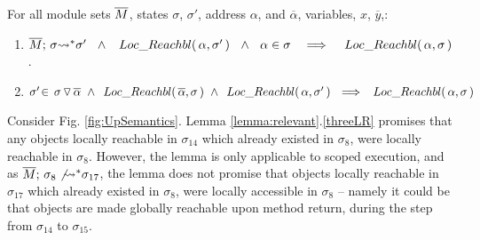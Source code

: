{\begin{lemma}
\label{lemma:relevant}
\label{lemma:push:N}
For all module sets $\overline{M}$, states $\sigma$, $\sigma'$,   address $\alpha$, and $\overline \alpha$, variables, $x$, $\overline {y}$,:
\begin{enumerate}
\item
\label{threeLR}
${\overline{M};\, {\sigma} {\rightsquigarrow^*} \sigma'} \ \ \wedge \ \   \,Loc\_Reachbl(\,\alpha,\sigma'\,)\  \ \wedge\ \  {\alpha\in \sigma} \ \ \ \Longrightarrow \ \ \ \,Loc\_Reachbl(\,\alpha,\sigma\,)$.
\item
\label{oneLR}
{$ \sigma'\!\in\! \PushS {\alpha} {\sigma}   \ \wedge  \  \LRelevant {\overline \alpha} {\sigma}  \ \wedge\    \LRelevant \alpha {\sigma'} \ \  \Longrightarrow\ \ 
 \LRelevant \alpha {\sigma}$
}
\end{enumerate}
\end{lemma}

{Consider Fig.  \ref{fig:UpSemantics}. %
Lemma \ref{lemma:relevant}.\ref{threeLR}  promises that any objects locally reachable in $\sigma_{14}$ which already existed in $\sigma_{8}$, were locally reachable in $\sigma_{8}$. However, the lemma is only  applicable to scoped execution, and as 
$\overline{M};\, {\sigma_8} \not{\rightsquigarrow^*} \sigma_{17}$, 
the lemma does not promise that  objects locally reachable in $\sigma_{17}$ which already existed in $\sigma_{8}$, were locally accessible in $\sigma_{8}$ -- namely it could be that objects are made globally reachable upon method return, during the step from $\sigma_{14}$ to $\sigma_{15}$.}

}
